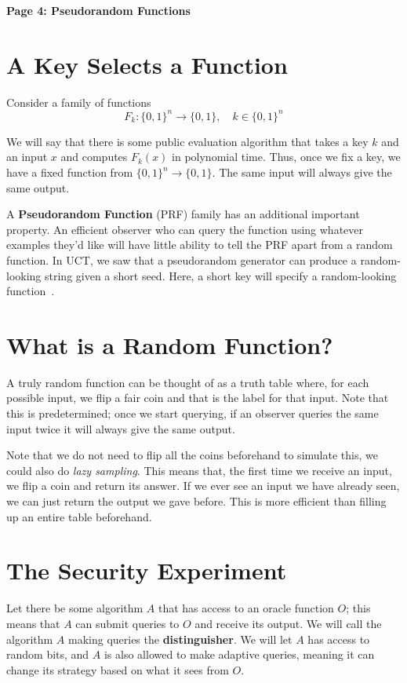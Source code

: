 \documentclass[11pt,fleqn]{article}
\begin{document}
\raggedright
\setlength{\parskip}{0.6em}

{\LARGE\bfseries Page 4: Pseudorandom Functions\par}
\medskip

\section{A Key Selects a Function}

Consider a family of functions
\[F_k : \{0, 1\}^n \to \{0, 1\}, \quad k \in \{0, 1\}^n\]

We will say that there is some public evaluation algorithm that takes a key $k$ and an input $x$ and computes $F_k(x)$ in polynomial time. Thus, once we fix a key, we have a fixed function from $\{0, 1\}^n \to \{0, 1\}$. The same input will always give the same output.

A \textbf{Pseudorandom Function} (PRF) family has an additional important property. An efficient observer who can query the function using whatever examples they'd like will have little ability to tell the PRF apart from a random function. In UCT, we saw that a pseudorandom generator can produce a random-looking string given a short seed. Here, a short key will specify a random-looking function~\cite{ggm,mit}.

\section{What is a Random Function?}

A truly random function can be thought of as a truth table where, for each possible input, we flip a fair coin and that is the label for that input. Note that this is predetermined; once we start querying, if an observer queries the same input twice it will always give the same output.

Note that we do not need to flip all the coins beforehand to simulate this, we could also do \textit{lazy sampling}. This means that, the first time we receive an input, we flip a coin and return its answer. If we ever see an input we have already seen, we can just return the output we gave before. This is more efficient than filling up an entire table beforehand.

\section{The Security Experiment}

Let there be some algorithm $A$ that has access to an oracle function $O$; this means that $A$ can submit queries to $O$ and receive its output. We will call the algorithm $A$ making queries the \textbf{distinguisher}. We will let $A$ has access to random bits, and $A$ is also allowed to make adaptive queries, meaning it can change its strategy based on what it sees from $O$.
\end{document}

